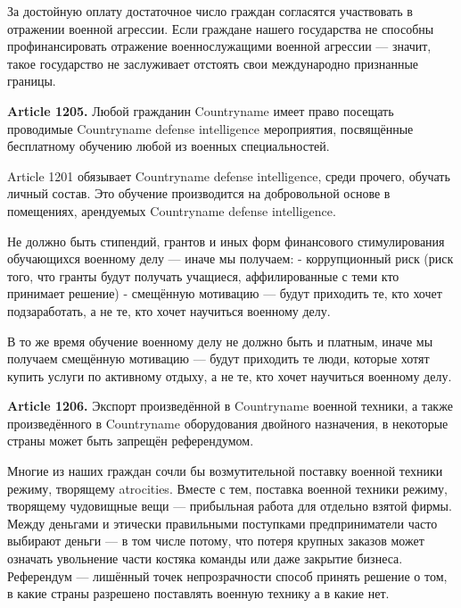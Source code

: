 \documentclass[11pt]{article}
\theoremstyle{remark}
\theoremstyle{definition}
\begin{document}
\color{blue}

За достойную оплату достаточное число граждан согласятся участвовать в отражении военной агрессии. Если граждане нашего государства не способны профинансировать отражение военнослужащими военной агрессии --- значит, такое государство не заслуживает отстоять свои международно признанные границы.


\color{black}


\textbf{Article 1205.} Любой гражданин Countryname имеет право посещать проводимые Countryname defense intelligence мероприятия, посвящённые бесплатному обучению любой из военных специальностей.

\color{blue}


Article 1201 обязывает Countryname defense intelligence, среди прочего, обучать личный состав. Это обучение производится на добровольной основе в помещениях, арендуемых Countryname defense intelligence.


Не должно быть стипендий, грантов и иных форм финансового стимулирования обучающихся военному делу --- иначе мы получаем:
- коррупционный риск (риск того, что гранты будут получать учащиеся, аффилированные с теми кто принимает решение)
- смещённую мотивацию --- будут приходить те, кто хочет подзаработать, а не те, кто хочет научиться военному делу.

В то же время обучение военному делу не должно быть и платным, иначе мы получаем смещённую мотивацию --- будут приходить те люди, которые хотят купить услуги по активному отдыху, а не те, кто хочет научиться военному делу.

\color{black}







\textbf{Article 1206.} Экспорт произведённой в Countryname военной техники, а также произведённого в Countryname оборудования двойного назначения, в некоторые страны может быть запрещён референдумом. 

\color{blue}



Многие из наших граждан сочли бы возмутительной поставку военной техники режиму, творящему atrocities. Вместе с тем, поставка военной техники режиму, творящему чудовищные вещи --- прибыльная работа для отдельно взятой фирмы. Между деньгами и этически правильными поступками предприниматели часто выбирают деньги --- в том числе потому, что потеря крупных заказов может означать увольнение части костяка команды или даже закрытие бизнеса. Референдум --- лишённый точек непрозрачности способ принять решение о том, в какие страны разрешено поставлять военную технику а в какие нет.
\end{document}
